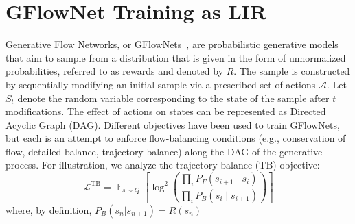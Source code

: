 \documentclass{article} %
\theoremstyle{plain}
\theoremstyle{definition}
\theoremstyle{remark}
\let\cite\citep
\DeclareMathOperator*{\Ex}{\mathbb{E}} %
\newcommand{\mehran}[1]{\todo[backgroundcolor=blue!20]{\textbf{Mehran:} #1}}
\newcommand{\oliver}[1]{\todo[backgroundcolor=green!20]{\textbf{Oliver:} #1}}
\begin{document}
\section{GFlowNet Training as LIR}


Generative Flow Networks, or GFlowNets~\cite{gflownet}, are probabilistic generative models that aim to sample from a distribution that is given in the form of unnormalized probabilities, referred to as rewards and denoted by $R$. The sample is constructed by sequentially modifying an initial sample via a prescribed set of actions $\mathcal{A}$. Let $S_t$ denote the random variable corresponding to the state of the sample after $t$ modifications. The effect of actions on states can be represented as Directed Acyclic Graph (DAG). 
Different objectives have been used to train GFlowNets, but each is an attempt to enforce flow-balancing conditions (e.g., conservation of flow, detailed balance, trajectory balance) along the DAG of the generative process. For illustration, we analyze the trajectory balance (TB) objective:
\[
\mathcal{L}^\mathrm{TB} = \Ex_{s \sim Q}\left[ \log^2\left( \frac{\prod_i P_F(s_{i+1} \mid s_i)}{\prod_i P_B(s_i \mid s_{i+1})} \right) \right]
\]
where, by definition, $P_B(s_n | s_{n+1}) = R(s_n)$
\end{document}
